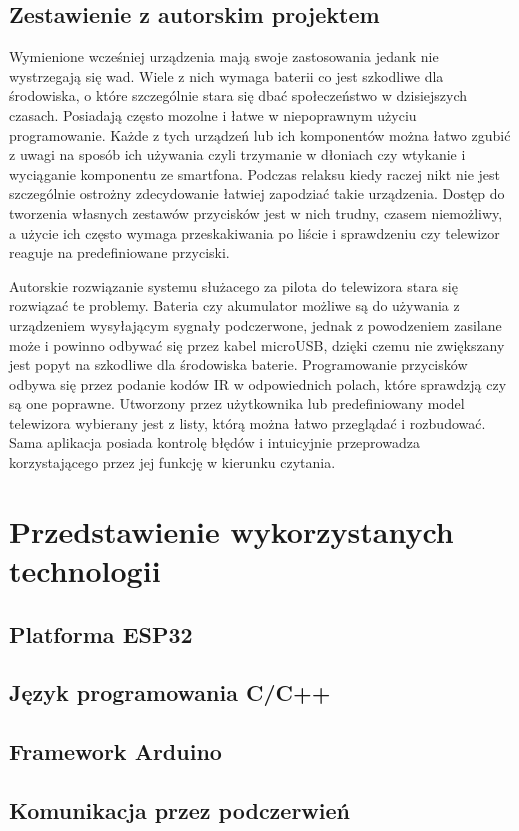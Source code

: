 \documentclass[12pt,twoside]{article}
\begin{document}
\subsection{Zestawienie z autorskim projektem}
{Wymienione wcześniej urządzenia mają swoje zastosowania jedank nie wystrzegają się wad. Wiele z nich 
 wymaga baterii co jest szkodliwe dla środowiska, o które szczególnie stara się dbać
społeczeństwo w dzisiejszych czasach. Posiadają często mozolne i łatwe w niepoprawnym użyciu programowanie. Każde z 
tych urządzeń lub ich komponentów można łatwo zgubić z uwagi na sposób ich używania czyli trzymanie w 
dłoniach czy wtykanie i wyciąganie komponentu ze smartfona. Podczas relaksu kiedy raczej nikt nie jest szczególnie 
ostrożny zdecydowanie łatwiej zapodziać takie urządzenia. Dostęp do tworzenia własnych zestawów przycisków jest w nich trudny,
 czasem niemożliwy, a użycie ich często wymaga przeskakiwania po liście i sprawdzeniu czy telewizor reaguje na predefiniowane przyciski.

Autorskie rozwiązanie systemu służacego za pilota do telewizora stara się rozwiązać te problemy. Bateria czy akumulator możliwe 
są do używania z urządzeniem wysyłającym sygnały podczerwone, jednak z powodzeniem zasilane może i powinno odbywać się przez 
kabel microUSB, dzięki czemu nie zwiększany jest popyt na szkodliwe dla środowiska baterie. Programowanie przycisków
odbywa się przez podanie kodów IR w odpowiednich polach, które sprawdzją czy są one poprawne. Utworzony przez użytkownika lub predefiniowany
 model telewizora wybierany jest z listy, którą można łatwo przeglądać i rozbudować. Sama aplikacja posiada kontrolę błędów
 i intuicyjnie przeprowadza korzystającego przez jej funkcję w kierunku czytania.
}
\clearpage
\section{Przedstawienie wykorzystanych technologii}
\subsection{Platforma ESP32}
\subsection{Język programowania C/C++}
\subsection{Framework Arduino}
\subsection{Komunikacja przez podczerwień}
\end{document}
